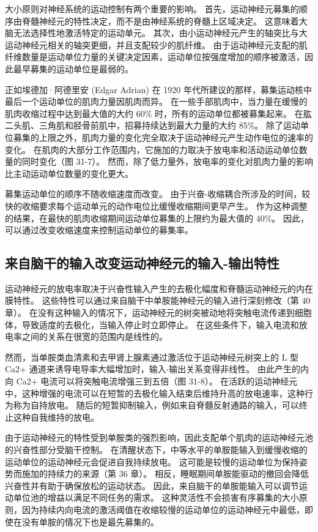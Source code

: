 大小原则对神经系统的运动控制有两个重要的影响。 首先，运动神经元募集的顺序由脊髓神经元的特性决定，而不是由神经系统的脊髓上区域决定。 这意味着大脑无法选择性地激活特定的运动单元。 其次，由小运动神经元产生的轴突比与大运动神经元相关的轴突更细，并且支配较少的肌纤维。 由于运动神经元支配的肌纤维数量是运动单位力量的关键决定因素，运动单位按强度增加的顺序被激活，因此最早募集的运动单位是最弱的。

正如埃德加·阿德里安 (Edgar Adrian) 在 1920 年代所建议的那样，募集运动核中最后一个运动单位的肌肉力量因肌肉而异。 在一些手部肌肉中，当力量在缓慢的肌肉收缩过程中达到最大值的大约 60\% 时，所有的运动单位都被募集起来。 在肱二头肌、三角肌和胫骨前肌中，招募持续达到最大力量的大约 85\%。 除了运动单位募集的上限之外，肌肉力量的变化完全取决于运动神经元产生动作电位的速率的变化。 在肌肉的大部分工作范围内，它施加的力取决于放电率和活动运动单位数量的同时变化（图 31-7）。 然而，除了低力量外，放电率的变化对肌肉力量的影响比主动运动单位数量的变化更大。

募集运动单位的顺序不随收缩速度而改变。 由于兴奋-收缩耦合所涉及的时间，较快的收缩要求每个运动单元的动作电位比缓慢收缩期间更早产生。 作为这种调整的结果，在最快的肌肉收缩期间运动单位募集的上限约为最大值的 40\%。 因此，可以通过改变收缩速度来控制运动单位的募集率。


\subsection{来自脑干的输入改变运动神经元的输入-输出特性}
运动神经元的放电率取决于兴奋性输入产生的去极化幅度和脊髓运动神经元的内在膜特性。 这些特性可以通过来自脑干中单胺能神经元的输入进行深刻修改（第 40 章）。 在没有这种输入的情况下，运动神经元的树突被动地将突触电流传递到细胞体，导致适度的去极化，当输入停止时立即停止。 在这些条件下，输入电流和放电率之间的关系在很宽的范围内是线性的。

然而，当单胺类血清素和去甲肾上腺素通过激活位于运动神经元树突上的 L 型 Ca2+ 通道来诱导电导率大幅增加时，输入-输出关系变得非线性。 由此产生的内向 Ca2+ 电流可以将突触电流增强三到五倍（图 31-8）。 在活跃的运动神经元中，这种增强的电流可以在短暂的去极化输入结束后维持升高的放电速率，这种行为称为自持放电。 随后的短暂抑制输入，例如来自脊髓反射通路的输入，可以终止这种自我维持的放电。

由于运动神经元的特性受到单胺类的强烈影响，因此支配单个肌肉的运动神经元池的兴奋性部分受脑干控制。 在清醒状态下，中等水平的单胺能输入到缓慢收缩的运动单位的运动神经元会促进自我持续放电。 这可能是较慢的运动单位为保持姿势而施加的持续力的来源（第 36 章）。 相反，睡眠期间单胺能驱动的撤回会降低兴奋性并有助于确保放松的运动状态。 因此，来自脑干的单胺能输入可以调节运动单位池的增益以满足不同任务的需求。 这种灵活性不会损害有序募集的大小原则，因为持续内向电流的激活阈值在收缩较慢的运动单位的运动神经元中最低，即使在没有单胺的情况下也是最先募集的。


